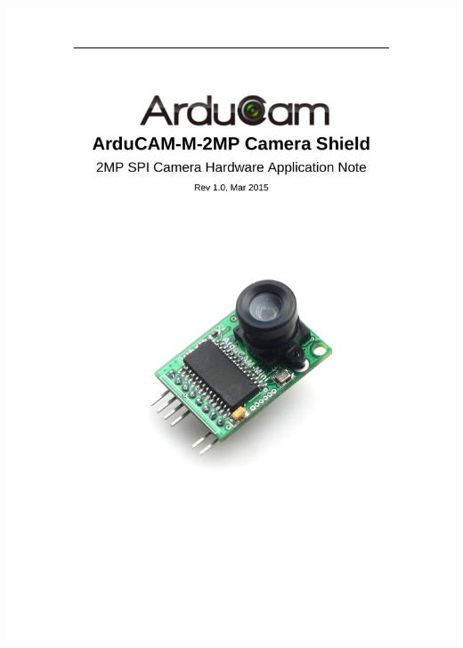 {
	\includegraphics[width=1\textwidth,page=\theVScounter]{../../MLbib/Arduino/ArduCAM/ArduCAM_Mini_2MP_Camera_Shield_Hardware_Application_Note.pdf}
	\newpage
}
